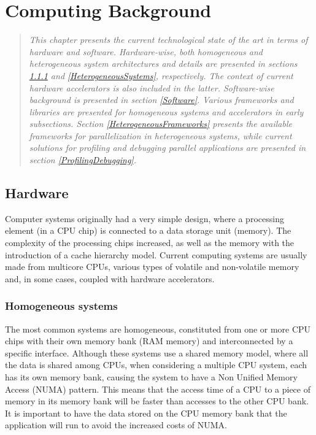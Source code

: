 \chapter{Computing Background}
\label{TechnologicalBackground}

\begin{quote}
\textit{This chapter presents the current technological state of the art in terms of hardware and software. Hardware-wise, both homogeneous and heterogeneous system architectures and details are presented in sections \ref{HomogeneousSystems} and \ref{HeterogeneousSystems}, respectively. The context of current hardware accelerators is also included in the latter. Software-wise background is presented in section \ref{Software}. Various frameworks and libraries are presented for homogeneous systems and accelerators in early subsections. Section \ref{HeterogeneousFrameworks} presents the available frameworks for parallelization in heterogeneous systems, while current solutions for profiling and debugging parallel applications are presented in section \ref{ProfilingDebugging}.}
\end{quote}

\section{Hardware}
\label{Hardware}

Computer systems originally had a very simple design, where a processing element (in a CPU chip) is connected to a data storage unit (memory). The complexity of the processing chips increased, as well as the memory with the introduction of a cache hierarchy model. Current computing systems are usually made from multicore CPUs, various types of volatile and non-volatile memory and, in some cases, coupled with hardware accelerators.

\subsection{Homogeneous systems}
\label{HomogeneousSystems}

The most common systems are homogeneous, constituted from one or more CPU chips with their own memory bank (RAM memory) and interconnected by a specific interface. Although these systems use a shared memory model, where all the data is shared among CPUs, when considering a multiple CPU system, each has its own memory bank, causing the system to have a Non Unified Memory Access (NUMA) pattern. This means that the access time of a CPU to a piece of memory in its memory bank will be faster than accesses to the other CPU bank. It is important to have the data stored on the CPU memory bank that the application will run to avoid the increased costs of NUMA.


